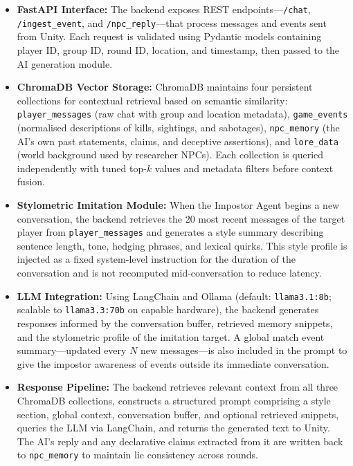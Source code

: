 \begin{itemize}

    \item \textbf{FastAPI Interface:}
    The backend exposes REST endpoints---\texttt{/chat}, \texttt{/ingest\_event}, and \texttt{/npc\_reply}---that process messages and events sent from Unity. Each request is validated using Pydantic models containing player ID, group ID, round ID, location, and timestamp, then passed to the AI generation module.

    \item \textbf{ChromaDB Vector Storage:}
    ChromaDB maintains four persistent collections for contextual retrieval based on semantic similarity: \texttt{player\_messages} (raw chat with group and location metadata), \texttt{game\_events} (normalised descriptions of kills, sightings, and sabotages), \texttt{npc\_memory} (the AI's own past statements, claims, and deceptive assertions), and \texttt{lore\_data} (world background used by researcher NPCs). Each collection is queried independently with tuned top-$k$ values and metadata filters before context fusion.

    \item \textbf{Stylometric Imitation Module:}
    When the Impostor Agent begins a new conversation, the backend retrieves the 20 most recent messages of the target player from \texttt{player\_messages} and generates a style summary describing sentence length, tone, hedging phrases, and lexical quirks. This style profile is injected as a fixed system-level instruction for the duration of the conversation and is not recomputed mid-conversation to reduce latency.

    \item \textbf{LLM Integration:}
    Using LangChain and Ollama (default: \texttt{llama3.1:8b}; scalable to \texttt{llama3.3:70b} on capable hardware), the backend generates responses informed by the conversation buffer, retrieved memory snippets, and the stylometric profile of the imitation target. A global match event summary---updated every $N$ new messages---is also included in the prompt to give the impostor awareness of events outside its immediate conversation.

    \item \textbf{Response Pipeline:}
    The backend retrieves relevant context from all three ChromaDB collections, constructs a structured prompt comprising a style section, global context, conversation buffer, and optional retrieved snippets, queries the LLM via LangChain, and returns the generated text to Unity. The AI's reply and any declarative claims extracted from it are written back to \texttt{npc\_memory} to maintain lie consistency across rounds.


\end{itemize}
